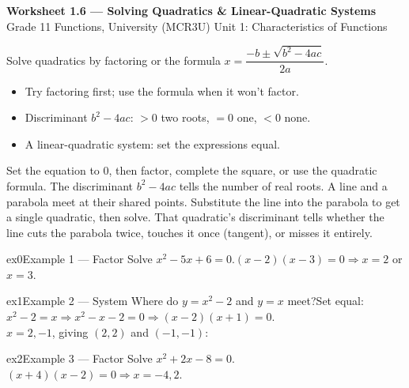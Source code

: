 \documentclass[11pt]{article}
\begin{document}
\begin{center}
{\LARGE\bfseries\color{titleblue}Worksheet 1.6 --- Solving Quadratics \& Linear-Quadratic Systems}\\[2pt]
{\small Grade 11 Functions, University (MCR3U) \textperiodcentered{} Unit 1: Characteristics of Functions}
\end{center}

\begin{ideabox}
Solve quadratics by factoring or the formula $x=\dfrac{-b\pm\sqrt{b^2-4ac}}{2a}$.
\begin{itemize}[leftmargin=*,itemsep=2pt]
  \item Try factoring first; use the formula when it won't factor.
  \item Discriminant $b^2-4ac$: $>0$ two roots, $=0$ one, $<0$ none.
  \item A linear-quadratic system: set the expressions equal.
\end{itemize}
\end{ideabox}

\begin{learnbox}
Set the equation to $0$, then factor, complete the square, or use the quadratic formula. The discriminant $b^2-4ac$ tells the number of real roots.
A line and a parabola meet at their shared points. Substitute the line into the parabola to get a single quadratic, then solve.
That quadratic's discriminant tells whether the line cuts the parabola twice, touches it once (tangent), or misses it entirely.
\end{learnbox}


\begin{example}{ex0}{Example 1 --- Factor}
Solve $x^2-5x+6=0$.\soln $(x-2)(x-3)=0\Rightarrow x=2$ or $x=3$.
\end{example}

\begin{example}{ex1}{Example 2 --- System}
Where do $y=x^2-2$ and $y=x$ meet?\soln Set equal: $x^2-2=x\Rightarrow x^2-x-2=0\Rightarrow(x-2)(x+1)=0$. \\ $x=2,-1$, giving $(2,2)$ and $(-1,-1)$:
\end{example}

\begin{example}{ex2}{Example 3 --- Factor}
Solve $x^2+2x-8=0$.\soln $(x+4)(x-2)=0\Rightarrow x=-4,2$.
\end{example}
\end{document}
